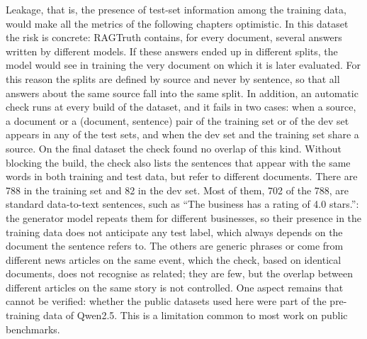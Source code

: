 Leakage, that is, the presence of test-set information among the training data, would make all the metrics of the
following chapters optimistic. In this dataset the risk is concrete: RAGTruth contains, for every document, several
answers written by different models. If these answers ended up in different splits, the model would see in training
the very document on which it is later evaluated. For this reason the splits are defined by source and never by
sentence, so that all answers about the same source fall into the same split. In addition, an automatic check runs at
every build of the dataset, and it fails in two cases: when a source, a document or a (document, sentence) pair of the
training set or of the dev set appears in any of the test sets, and when the dev set and the training set share a
source. On the final dataset the check found no overlap of this kind. Without blocking the build, the check also lists
the sentences that appear with the same words in both training and test data, but refer to different documents. There are 788 in the training set and 82 in the dev set. Most of them, 702 of the 788, are standard data-to-text sentences, such as ``The business has a rating of 4.0 stars.'': the generator model repeats them for different businesses, so their presence in the training data does not anticipate any test label, which always depends on the document the sentence refers to. The others are generic phrases or come from different news articles on the same event, which the check, based on identical documents, does not recognise as related; they are few, but the overlap between different articles on the same story is not controlled. One aspect remains that cannot
be verified: whether the public datasets used here were part of the pre-training data of Qwen2.5. This is a limitation
common to most work on public benchmarks.
